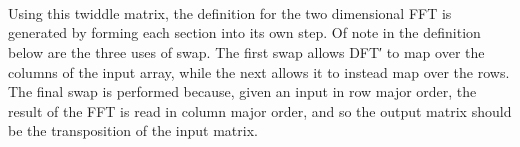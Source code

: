 \begin{code}[hide]%
\>[2][@{}l@{\AgdaIndent{1}}]%
\>[6]\<%
\\
\>[6][@{}l@{\AgdaIndent{0}}]%
\>[8]\<%
\\
\>[8][@{}l@{\AgdaIndent{0}}]%
\>[10]\<%
\\
\>[10][@{}l@{\AgdaIndent{0}}]%
\>[12]\AgdaSymbol{\AgdaUnderscore{}}\AgdaSpace{}%
\AgdaSymbol{:}\AgdaSpace{}%
\AgdaSpace{}%
\AgdaSymbol{(}\AgdaSpace{}%
\AgdaSpace{}%
\AgdaSymbol{)}\<%
\end{code}

Using this twiddle matrix, the definition for the two dimensional FFT is generated
by forming each section into its own step.
Of note in the definition below are the three uses of swap.
The first swap allows DFT′ to map over the columns of the input array,
while the next allows it to instead map over the rows.
The final swap is performed because, given an input in row major order, the 
result of the FFT is read in column major order, and so the output matrix should
be the transposition of the input matrix.

